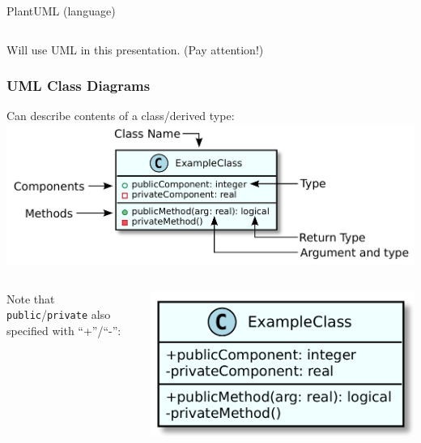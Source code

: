 \documentclass[12pt]{beamer}
\begin{document}
\begin{frame}
\begin{columns}
\begin{column}{0.5\textwidth}
      PlantUML (language)
    \end{column}
  \end{columns}
  
  \vspace{3mm}
  Will use UML in this presentation. (Pay attention!)
\end{frame}

\begin{frame}
  \frametitle{UML Class Diagrams}
  Can describe contents of a class/derived type:
  \includegraphics[width=\textwidth]{class_diagram.pdf}
  
  \begin{columns}
    \begin{column}{0.55\textwidth}
      Note that \texttt{public}/\texttt{private} also specified with
      ``+''/``-'':
    \end{column}
    \begin{column}{0.45\textwidth}
      \includegraphics[width=\textwidth]{class_diagram_plain.pdf}
    \end{column}
  \end{columns}
\end{frame}
\end{document}
